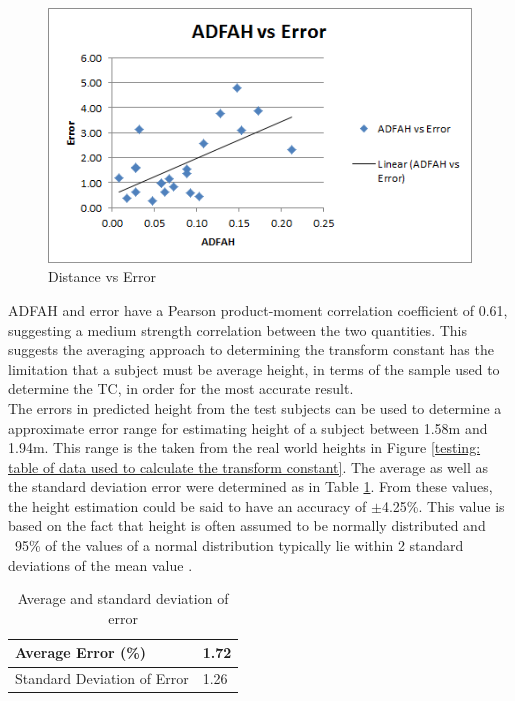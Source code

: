 \begin{figure}[!htb]
\begin{center}
\includegraphics[scale=0.8]{images/distvserror} 
\end{center}
\caption{Distance vs Error}
\label{distance vs error}
\end{figure} 

ADFAH and error have a Pearson product-moment correlation coefficient of 0.61, suggesting a medium strength correlation \cite{cohen88,buda2011} between the two quantities. This suggests the averaging approach to determining the transform constant has the limitation that a subject must be average height, in terms of the sample used to determine the TC, in order for the most accurate result.\\

The errors in predicted height from the test subjects can be used to determine a approximate error range for estimating height of a subject between 1.58m and 1.94m. This range is the taken from the real world heights in Figure \ref{testing: table of data used to calculate the transform constant}. The average as well as the standard deviation error were determined as in Table \ref{average and standard deviation of error}. From these values, the height estimation could be said to have an accuracy of $\pm$4.25\%. This value is based on the fact that height is often assumed to be normally distributed \cite{chali1995} and ~95\% of the values of a normal distribution typically lie within 2 standard deviations of the mean value \cite{pukelsheim1994}.\\

\begin{table}[!htb]
\begin{center}
  \begin{tabular}{| l | l |}
    \hline
    Average Error (\%) & 1.72\\ \hline
    Standard Deviation of Error & 1.26\\ \hline
  \end{tabular}
\end{center}
\caption{Average and standard deviation of error}
\label{average and standard deviation of error}
\end{table}


